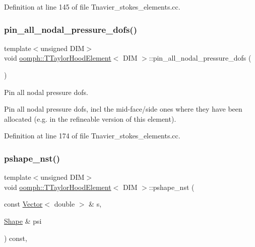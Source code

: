 Definition at line 145 of file Tnavier\+\_\+stokes\+\_\+elements.\+cc.

\mbox{\label{classoomph_1_1TTaylorHoodElement_a07845585c278b8bfd1a919e0cfe9e8ef}} 
\subsubsection{\texorpdfstring{pin\+\_\+all\+\_\+nodal\+\_\+pressure\+\_\+dofs()}{pin\_all\_nodal\_pressure\_dofs()}}
{\footnotesize\ttfamily template$<$unsigned D\+IM$>$ \\
void \hyperlink{classoomph_1_1TTaylorHoodElement}{oomph\+::\+T\+Taylor\+Hood\+Element}$<$ D\+IM $>$\+::pin\+\_\+all\+\_\+nodal\+\_\+pressure\+\_\+dofs (\begin{DoxyParamCaption}{ }\end{DoxyParamCaption})\hspace{0.3cm}{\ttfamily [protected]}}



Pin all nodal pressure dofs. 

Pin all nodal pressure dofs, incl the mid-\/face/side ones where they have been allocated (e.\+g. in the refineable version of this element). 

Definition at line 174 of file Tnavier\+\_\+stokes\+\_\+elements.\+cc.

\mbox{\label{classoomph_1_1TTaylorHoodElement_a78814850aa0ff675479394d0dda7d1e8}} 
\subsubsection{\texorpdfstring{pshape\+\_\+nst()}{pshape\_nst()}\hspace{0.1cm}{\footnotesize\ttfamily [1/4]}}
{\footnotesize\ttfamily template$<$unsigned D\+IM$>$ \\
void \hyperlink{classoomph_1_1TTaylorHoodElement}{oomph\+::\+T\+Taylor\+Hood\+Element}$<$ D\+IM $>$\+::pshape\+\_\+nst (\begin{DoxyParamCaption}\item[{const \hyperlink{classoomph_1_1Vector}{Vector}$<$ double $>$ \&}]{s,  }\item[{\hyperlink{classoomph_1_1Shape}{Shape} \&}]{psi }\end{DoxyParamCaption}) const\hspace{0.3cm}{\ttfamily [inline]}, {\ttfamily [virtual]}}



